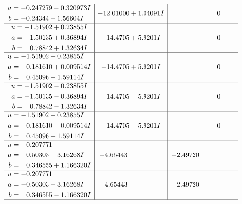 \documentclass[1p]{elsarticle_modified}
\theoremstyle{definition}
\begin{document}
$$\begin{array}{c|c|c}
\begin{aligned}
a &= -0.247279 - 0.320973 I \\
b &= -0.24344 - 1.56604 I\end{aligned}
 & -12.01000 + 1.04091 I & \phantom{-0.000000 } 0 \\ \hline\begin{aligned}
u &= -1.51902 + 0.23855 I \\
a &= -1.50135 + 0.36894 I \\
b &= \phantom{-}0.78842 + 1.32634 I\end{aligned}
 & -14.4705 + 5.9201 I & \phantom{-0.000000 } 0 \\ \hline\begin{aligned}
u &= -1.51902 + 0.23855 I \\
a &= \phantom{-}0.181610 + 0.009514 I \\
b &= \phantom{-}0.45096 - 1.59114 I\end{aligned}
 & -14.4705 + 5.9201 I & \phantom{-0.000000 } 0 \\ \hline\begin{aligned}
u &= -1.51902 - 0.23855 I \\
a &= -1.50135 - 0.36894 I \\
b &= \phantom{-}0.78842 - 1.32634 I\end{aligned}
 & -14.4705 - 5.9201 I & \phantom{-0.000000 } 0 \\ \hline\begin{aligned}
u &= -1.51902 - 0.23855 I \\
a &= \phantom{-}0.181610 - 0.009514 I \\
b &= \phantom{-}0.45096 + 1.59114 I\end{aligned}
 & -14.4705 - 5.9201 I & \phantom{-0.000000 } 0 \\ \hline\begin{aligned}
u &= -0.207771\phantom{ +0.000000I} \\
a &= -0.50303 + 3.16268 I \\
b &= \phantom{-}0.346555 + 1.166320 I\end{aligned}
 & -4.65443\phantom{ +0.000000I} & -2.49720\phantom{ +0.000000I} \\ \hline\begin{aligned}
u &= -0.207771\phantom{ +0.000000I} \\
a &= -0.50303 - 3.16268 I \\
b &= \phantom{-}0.346555 - 1.166320 I\end{aligned}
 & -4.65443\phantom{ +0.000000I} & -2.49720\phantom{ +0.000000I}\\
 \hline 
 \end{array}$$\newpage\newpage\renewcommand{\arraystretch}{1}
\end{document}
